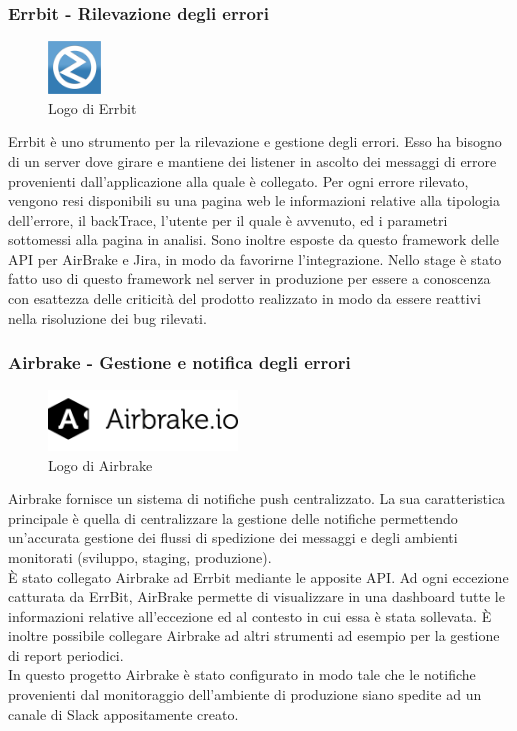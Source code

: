 \subsubsection{Errbit - Rilevazione degli errori }

\begin{figure}[htbp]
\begin{center}
\includegraphics[height=1.4cm]{Pics/errbit_logo.png}
\caption{Logo di Errbit}
\end{center}
\end{figure}

Errbit è uno strumento per la rilevazione e gestione degli errori. Esso ha bisogno di un server dove girare e mantiene dei listener in ascolto dei messaggi di errore provenienti dall'applicazione alla quale è collegato.
Per ogni errore rilevato, vengono resi disponibili su una pagina web le informazioni relative alla tipologia dell'errore, il backTrace, l'utente per il quale è avvenuto, ed i parametri sottomessi alla pagina in analisi.
Sono inoltre esposte da questo framework delle API per AirBrake e Jira, in modo da favorirne l'integrazione.
Nello stage è stato fatto uso di questo framework nel server in produzione per essere a conoscenza con esattezza delle criticità del prodotto realizzato in modo da essere reattivi nella risoluzione dei bug rilevati.

\subsubsection{Airbrake - Gestione e notifica degli errori}

\begin{figure}[htbp]
\begin{center}
\includegraphics[height=1.6cm]{Pics/airbrake_logo.png}
\caption{Logo di Airbrake}
\end{center}
\end{figure}

Airbrake fornisce un sistema di notifiche push centralizzato. La sua caratteristica principale è quella di centralizzare la gestione delle notifiche permettendo un'accurata gestione dei flussi di spedizione dei messaggi e degli ambienti monitorati (sviluppo, staging, produzione). \\ 
È stato collegato Airbrake ad Errbit mediante le apposite API. 
Ad ogni eccezione catturata da ErrBit, AirBrake permette di visualizzare in una dashboard tutte le informazioni relative all'eccezione ed al contesto in cui essa è stata sollevata.  È inoltre possibile collegare Airbrake ad altri strumenti ad esempio per la gestione di report periodici. \\ 
 In questo progetto Airbrake è stato configurato in modo tale che le notifiche provenienti dal monitoraggio dell'ambiente di produzione siano spedite ad un canale di Slack appositamente creato.

